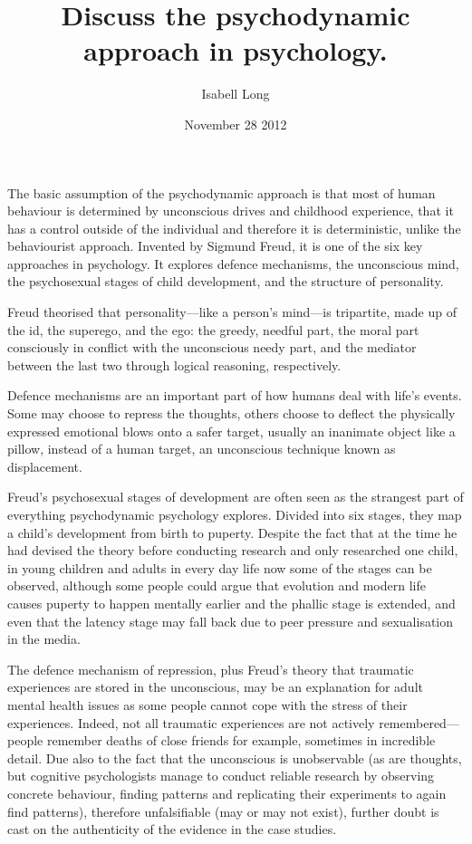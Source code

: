 \documentclass[a4paper]{article}
\begin{document}
\title{Discuss the psychodynamic approach in psychology.}
\author{Isabell Long}
\date{November 28 2012}
\maketitle

The basic assumption of the psychodynamic approach is that most of human behaviour is determined by unconscious drives and childhood experience, that it has a control outside of the individual and therefore it is deterministic, unlike the behaviourist approach. Invented by Sigmund Freud, it is one of the six key approaches in psychology. It explores defence mechanisms, the unconscious mind, the psychosexual stages of child development, and the structure of personality.

Freud theorised that personality---like a person's mind---is tripartite, made up of the id, the superego, and the ego: the greedy, needful part, the moral part consciously in conflict with the unconscious needy part, and the mediator between the last two through logical reasoning, respectively.

Defence mechanisms are an important part of how humans deal with life's events. Some may choose to repress the thoughts, others choose to deflect the physically expressed emotional blows onto a safer target, usually an inanimate object like a pillow, instead of a human target, an unconscious technique known as displacement.

Freud's psychosexual stages of development are often seen as the strangest part of everything psychodynamic psychology explores. Divided into six stages, they map a child's development from birth to puperty. Despite the fact that at the time he had devised the theory before conducting research and only researched one child, in young children and adults in every day life now some of the stages can be observed, although some people could argue that evolution and modern life causes puperty to happen mentally earlier and the phallic stage is extended, and even that the latency stage may fall back due to peer pressure and sexualisation in the media.

The defence mechanism of repression, plus Freud's theory that traumatic experiences are stored in the unconscious, may be an explanation for adult mental health issues as some people cannot cope with the stress of their experiences. Indeed, not all traumatic experiences are not actively remembered---people remember deaths of close friends for example, sometimes in incredible detail. Due also to the fact that the unconscious is unobservable (as are thoughts, but cognitive psychologists manage to conduct reliable research by observing concrete behaviour, finding patterns and replicating their experiments to again find patterns), therefore unfalsifiable (may or may not exist), further doubt is cast on the authenticity of the evidence in the case studies.
\end{document}
